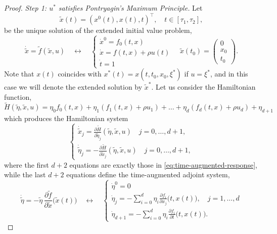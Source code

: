 \documentclass[reqno]{amsart}
\theoremstyle{definition}
\numberwithin{equation}{section}
\begin{document}
\begin{proof}
\emph{Step 1: $u^*$ satisfies Pontryagin's Maximum Principle.}
Let
\[
\widetilde x(t)=\left(x^0(t),x(t),t\right)^\top,\quad t\in[\tau_1,\tau_2],
\]
 be the unique solution of the extended initial value problem, 
\begin{equation}\label{eq:time-augmented-response}
\dot{\widetilde x}=\widetilde f(\widetilde x,u)
\quad\leftrightarrow\quad
\begin{cases}
    \dot x^0=f_0(t,x)\\
    \dot x= f(t,x)+\rho u(t)\\
    \dot t=1
\end{cases}
\quad\widetilde x(t_0)=
\begin{pmatrix}
0\\ x_0\\t_0    
\end{pmatrix}.
\end{equation}
Note that $x(t)$ coincides with $x^*(t)=x(t,t_0,x_0,\xi^*)$ if $u=\xi^*$, and in this case we will denote the extended solution by $\widetilde x^*$. Let us consider the Hamiltonian function, 
\begin{equation}\label{eq:hamiltonian-function}
\widetilde H(\widetilde \eta,\widetilde x,u)=\eta_0 f_0(t,x)+\eta_1 (f_1(t,x)+\rho u_1)+\dots+\eta_d(f_d(t,x)+ \rho u_d)+\eta_{d+1}
\end{equation}
which produces the Hamiltonian system
\[
\begin{cases}\displaystyle
    \dot{\widetilde x}_j= \frac{\partial\widetilde H}{\partial\widetilde\eta_j}(\widetilde \eta,\widetilde x,u)\quad j=0,\dots,d+1,\\[2ex] \displaystyle
    \dot{\widetilde\eta}_j= -\frac{\partial\widetilde H}{\partial\widetilde x_j}(\widetilde \eta,\widetilde x,u)\quad j=0,\dots,d+1,
\end{cases}
\]
where the first $d+2$ equations are exactly those in \eqref{eq:time-augmented-response}, while the last $d+2$ equations define the time-augmented adjoint system, 
\begin{equation}\label{eq:time-augmented-adjoint}
\dot{\widetilde\eta}=-\widetilde\eta\, \frac{\partial \widetilde f}{\partial \widetilde x}\big(\widetilde x(t)\big)\quad\leftrightarrow\quad
\begin{cases}
    \dot \eta^0=0\\
    \dot \eta_j= -\sum_{i=0}^d\eta_i \frac{\partial f_i}{\partial x_j}\big(t,x(t)\big),\quad j=1,\dots,d\\
    \dot \eta_{d+1}=-\sum_{i=0}^d\eta_i \frac{\partial f_i}{\partial t}\big(t,x(t)\big).

\end{cases}
\end{equation}
\end{proof}
\end{document}
